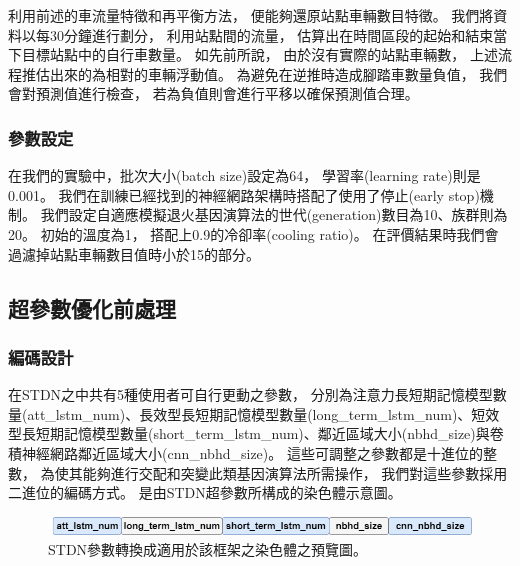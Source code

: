 \documentclass[a4paper,14pt]{extarticle}
\begin{document}
                利用前述的車流量特徵和再平衡方法，
                便能夠還原站點車輛數目特徵。
                我們將資料以每30分鐘進行劃分，
                利用站點間的流量，
                估算出在時間區段的起始和結束當下目標站點中的自行車數量。
                如先前所說，
                由於沒有實際的站點車輛數，
                上述流程推估出來的為相對的車輛浮動值。
                為避免在逆推時造成腳踏車數量負值，
                我們會對預測值進行檢查，
                若為負值則會進行平移以確保預測值合理。

            \subsubsection{參數設定}
                \label{subsec:parameters_setting}
                在我們的實驗中，批次大小(batch size)設定為64，
                學習率(learning rate)則是0.001。
                我們在訓練已經找到的神經網路架構時搭配了使用了停止(early stop)機制。
                我們設定自適應模擬退火基因演算法的世代(generation)數目為10、族群則為20。
                初始的溫度為1，
                搭配上0.9的冷卻率(cooling ratio)。
                在評價結果時我們會過濾掉站點車輛數目值時小於15的部分。

            \subsection{超參數優化前處理}
                \subsubsection{編碼設計}

                    在STDN之中共有5種使用者可自行更動之參數，
                    分別為注意力長短期記憶模型數量(att\_lstm\_num)、長效型長短期記憶模型數量(long\_term\_lstm\_num)、短效型長短期記憶模型數量(short\_term\_lstm\_num)、鄰近區域大小(nbhd\_size)與卷積神經網路鄰近區域大小(cnn\_nbhd\_size)。
                    這些可調整之參數都是十進位的整數，
                    為使其能夠進行交配和突變此類基因演算法所需操作，
                    我們對這些參數採用二進位的編碼方式。
                    是由STDN超參數所構成的染色體示意圖。
                    \begin{figure}[htbp]
                        \centering
                        \includegraphics[width=\textwidth]{chromosome_sheme.png}
                        \caption{
                            {\fontsize{12pt}{10pt}\selectfont
                                STDN參數轉換成適用於該框架之染色體之預覽圖。
                            }
                        }
                        \label{fig:chromosome_sheme}
                    \end{figure}
\end{document}
